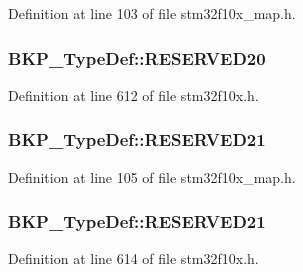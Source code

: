Definition at line 103 of file stm32f10x\+\_\+map.\+h.

\subsubsection[{\texorpdfstring{R\+E\+S\+E\+R\+V\+E\+D20}{RESERVED20}}]{ B\+K\+P\+\_\+\+Type\+Def\+::\+R\+E\+S\+E\+R\+V\+E\+D20}\hypertarget{struct_b_k_p___type_def_aa9f0604cc7bbe9311ac970355594e5d9}{}\label{struct_b_k_p___type_def_aa9f0604cc7bbe9311ac970355594e5d9}


Definition at line 612 of file stm32f10x.\+h.

\subsubsection[{\texorpdfstring{R\+E\+S\+E\+R\+V\+E\+D21}{RESERVED21}}]{ B\+K\+P\+\_\+\+Type\+Def\+::\+R\+E\+S\+E\+R\+V\+E\+D21}\hypertarget{struct_b_k_p___type_def_a957418b5a145f39b5bb870b9688183c3}{}\label{struct_b_k_p___type_def_a957418b5a145f39b5bb870b9688183c3}


Definition at line 105 of file stm32f10x\+\_\+map.\+h.

\subsubsection[{\texorpdfstring{R\+E\+S\+E\+R\+V\+E\+D21}{RESERVED21}}]{ B\+K\+P\+\_\+\+Type\+Def\+::\+R\+E\+S\+E\+R\+V\+E\+D21}\hypertarget{struct_b_k_p___type_def_a64e9db8466ffeea1c22b42f1a447f3f2}{}\label{struct_b_k_p___type_def_a64e9db8466ffeea1c22b42f1a447f3f2}


Definition at line 614 of file stm32f10x.\+h.

